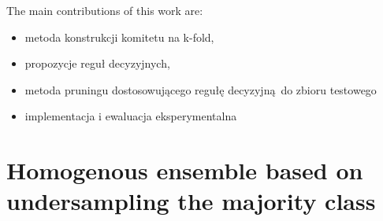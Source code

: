 \documentclass[pmlr]{jmlr}
\begin{document}



The main contributions of this work are:
\begin{itemize}
	\item metoda konstrukcji komitetu na k-fold,
	\item propozycje reguł decyzyjnych,
	\item metoda pruningu dostosowującego regułę decyzyjną do zbioru testowego
	\item implementacja i ewaluacja eksperymentalna
\end{itemize}

\vspace{5em}
\section{Homogenous ensemble based on undersampling the majority class}
\label{sec:intro}
\end{document}

